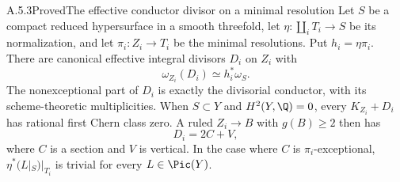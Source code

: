 \begin{statement}{A.5.3}{Proved}{The effective conductor divisor on a minimal resolution}
Let $S$ be a compact reduced hypersurface in a smooth threefold, let $\eta:\coprod_i T_i\to S$ be its normalization, and let $\pi_i:Z_i\to T_i$ be the minimal resolutions. Put $h_i=\eta\pi_i$. There are canonical effective integral divisors $D_i$ on $Z_i$ with
\[
 \omega_{Z_i}(D_i)\simeq h_i^*\omega_S.
 \tag{A.25}
\]
The nonexceptional part of $D_i$ is exactly the divisorial conductor, with its scheme-theoretic multiplicities. When $S\subset Y$ and $H^2(Y,\Q)=0$, every $K_{Z_i}+D_i$ has rational first Chern class zero. A ruled $Z_i\to B$ with $g(B)\ge2$ then has
\[
 D_i=2C+V,
 \tag{A.26}
\]
where $C$ is a section and $V$ is vertical. In the case where $C$ is $\pi_i$-exceptional, $\eta^*(L|_S)|_{T_i}$ is trivial for every $L\in\Pic(Y)$.
\end{statement}
